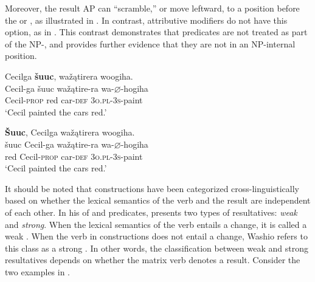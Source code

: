 \documentclass[output=paper]{LSP/langsci}
\begin{document}
Moreover, the result AP can ``scramble,'' or move leftward, to a position before the  or , as illustrated in . In contrast, attributive modifiers do not have this option, as in . This contrast demonstrates that  predicates are not treated as part of the NP-, and provides further evidence that they are not in an NP-internal position.

\begin{exe}
\ex\label{ex:rosen:9}
\begin{xlist}

\ex \glll Cecilga \textbf{šuuc}, wažątirera woogiha. \\
 Cecil-ga šuuc  wažątire-ra wa-{$\varnothing$}-hogiha\\
 Cecil-\textsc{prop} red car-\textsc{def} \textsc{3o.pl}-\textsc{3s}-paint \\
\glt `Cecil painted the cars red.'

\ex \glll \textbf{\v{S}uuc}, Cecilga wažątirera woogiha. \\
  šuuc Cecil-ga wažątire-ra wa-{$\varnothing$}-hogiha\\
red Cecil-\textsc{prop} car-\textsc{def} \textsc{3o.pl}-\textsc{3s}-paint \\
\glt `Cecil painted the cars red.'

\end{xlist}




\end{exe}

It should be noted that  constructions have been categorized cross-linguistically based on whether the lexical semantics of the verb and the result are independent of each other. In his  of  and   predicates, \citet{Washio1997} presents two types of resultatives: \textit{weak} and \textit{strong}. When the lexical semantics of the verb entails a change, it is called a weak . When the verb in  constructions does not entail a change, Washio refers to this class as a strong . In other words, the classification between weak and strong resultatives depends on whether the matrix verb denotes a result. Consider the two  examples in .
\end{document}

